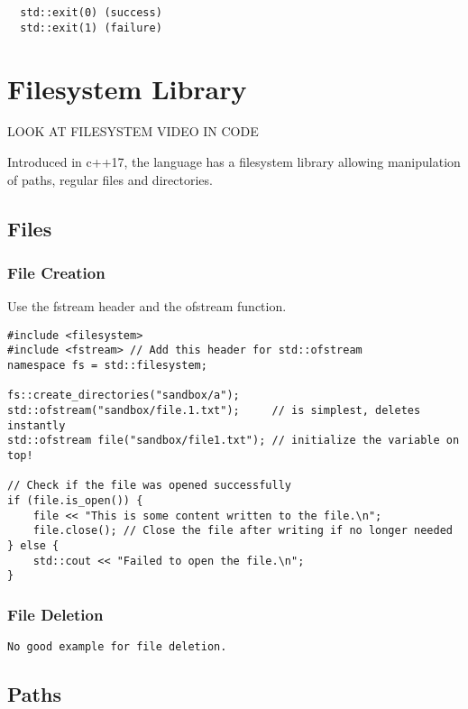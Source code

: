 \begin{verbatim}
  std::exit(0) (success)
  std::exit(1) (failure)
\end{verbatim}

\chapter{Filesystem Library}

LOOK AT FILESYSTEM VIDEO IN CODE

Introduced in c++17, the language has a filesystem library allowing
manipulation of paths, regular files and directories.

\section{Files}

\subsection{File Creation}

Use the fstream header and the ofstream function.

\begin{verbatim}
#include <filesystem>
#include <fstream> // Add this header for std::ofstream
namespace fs = std::filesystem;

fs::create_directories("sandbox/a");
std::ofstream("sandbox/file.1.txt");     // is simplest, deletes instantly
std::ofstream file("sandbox/file1.txt"); // initialize the variable on top!

// Check if the file was opened successfully
if (file.is_open()) {
    file << "This is some content written to the file.\n";
    file.close(); // Close the file after writing if no longer needed
} else {
    std::cout << "Failed to open the file.\n";
}
\end{verbatim}

\subsection{File Deletion}
\begin{verbatim}
No good example for file deletion.
\end{verbatim}


\section{Paths}

